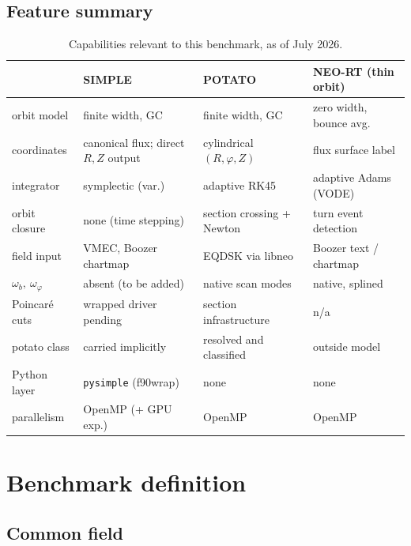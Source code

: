 \documentclass[11pt,a4paper]{article}
\newcommand{\code}[1]{\texttt{#1}}
\begin{document}
\subsection{Feature summary}

\begin{table}[htb]
\centering
\small
\begin{tabularx}{\textwidth}{@{}lXXX@{}}
\toprule
 & SIMPLE & POTATO & NEO-RT (thin orbit) \\
\midrule
orbit model & finite width, GC & finite width, GC & zero width, bounce avg. \\
coordinates & canonical flux; direct $R,Z$ output & cylindrical $(R,\varphi,Z)$ & flux surface label \\
integrator & symplectic (var.) & adaptive RK45 & adaptive Adams (VODE) \\
orbit closure & none (time stepping) & section crossing + Newton & turn event detection \\
field input & VMEC, Boozer chartmap & EQDSK via libneo & Boozer text / chartmap \\
$\omega_b,\ \omega_\varphi$ & absent (to be added) & native scan modes & native, splined \\
Poincar\'e cuts & wrapped driver pending & section infrastructure & n/a \\
potato class & carried implicitly & resolved and classified & outside model \\
Python layer & \code{pysimple} (f90wrap) & none & none \\
parallelism & OpenMP (+ GPU exp.) & OpenMP & OpenMP \\
\bottomrule
\end{tabularx}
\caption{Capabilities relevant to this benchmark, as of July 2026.}
\label{tab:features}
\end{table}

\section{Benchmark definition}
\label{sec:benchmark}

\subsection{Common field}
\label{sec:field}
\end{document}
